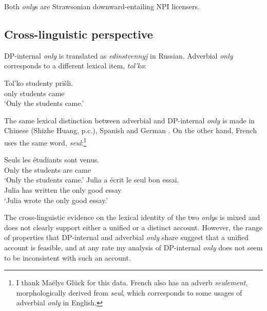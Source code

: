Both \textit{only}s are Strawsonian downward-entailing NPI licensers.

\subsection{Cross-linguistic perspective}
DP-internal \textit{only} is translated as \textit{edinstvennyj} in Russian. Adverbial \textit{only} corresponds to a different lexical item, \textit{tol'ko}:

\begin{exe}
	\ex \gll Tol'ko studenty pri\v{s}li.\\
	only students came\\
	\glt `Only the students came.'
\end{exe}

The same lexical distinction between adverbial and DP-internal \textit{only} is made in Chinese (Shizhe Huang, p.c.), Spanish and German \citep{mcnally08}. On the other hand, French uses the same word, \textit{seul}:\footnote{I thank Ma\"{e}lys Gl\"{u}ck for this data. French also has an adverb \textit{seulement}, morphologically derived from \textit{seul}, which corresponds to some usages of adverbial \textit{only} in English.}

\begin{exe}
	\ex \gll Seuls les \'{e}tudiants sont venus.\\
	Only the students are came\\
	\glt `Only the students came.'
	\ex \gll Julia a \'{e}crit le seul bon essai.\\
	Julia has written the only good essay\\
	\glt `Julia wrote the only good essay.'
\end{exe}

The cross-linguistic evidence on the lexical identity of the two \textit{only}s is mixed and does not clearly support either a unified or a distinct account. However, the range of properties that DP-internal and adverbial \textit{only} share suggest that a unified account is feasible, and at any rate my analysis of DP-internal \textit{only} does not seem to be inconsistent with such an account.